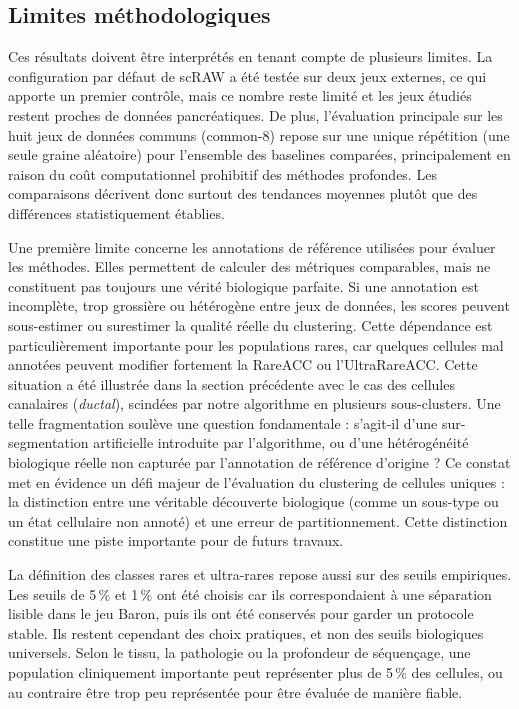 \FloatBarrier
\subsection{Limites méthodologiques}
\label{sec:limites_perspectives}

Ces résultats doivent être interprétés en tenant compte de plusieurs limites. La configuration par défaut de scRAW a été testée sur deux jeux externes, ce qui apporte un premier contrôle, mais ce nombre reste limité et les jeux étudiés restent proches de données pancréatiques. De plus, l'évaluation principale sur les huit jeux de données communs (common-8) repose sur une unique répétition (une seule graine aléatoire) pour l'ensemble des baselines comparées, principalement en raison du coût computationnel prohibitif des méthodes profondes. Les comparaisons décrivent donc surtout des tendances moyennes plutôt que des différences statistiquement établies.

Une première limite concerne les annotations de référence utilisées pour évaluer les méthodes. Elles permettent de calculer des métriques comparables, mais ne constituent pas toujours une vérité biologique parfaite. Si une annotation est incomplète, trop grossière ou hétérogène entre jeux de données, les scores peuvent sous-estimer ou surestimer la qualité réelle du clustering. Cette dépendance est particulièrement importante pour les populations rares, car quelques cellules mal annotées peuvent modifier fortement la RareACC ou l'UltraRareACC. Cette situation a été illustrée dans la section précédente avec le cas des cellules canalaires (\textit{ductal}), scindées par notre algorithme en plusieurs sous-clusters. Une telle fragmentation soulève une question fondamentale : s'agit-il d'une sur-segmentation artificielle introduite par l'algorithme, ou d'une hétérogénéité biologique réelle non capturée par l'annotation de référence d'origine ? Ce constat met en évidence un défi majeur de l'évaluation du clustering de cellules uniques : la distinction entre une véritable découverte biologique (comme un sous-type ou un état cellulaire non annoté) et une erreur de partitionnement. Cette distinction constitue une piste importante pour de futurs travaux.

La définition des classes rares et ultra-rares repose aussi sur des seuils empiriques. Les seuils de 5\,\% et 1\,\% ont été choisis car ils correspondaient à une séparation lisible dans le jeu Baron, puis ils ont été conservés pour garder un protocole stable. Ils restent cependant des choix pratiques, et non des seuils biologiques universels. Selon le tissu, la pathologie ou la profondeur de séquençage, une population cliniquement importante peut représenter plus de 5\,\% des cellules, ou au contraire être trop peu représentée pour être évaluée de manière fiable.

